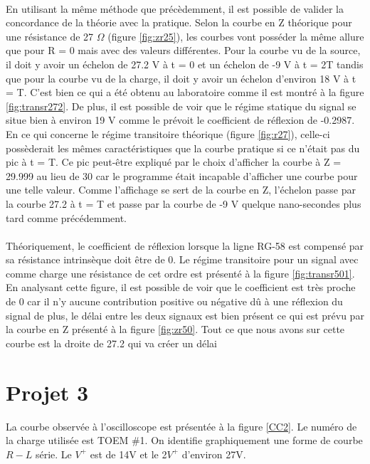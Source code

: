 \paragraph{} En utilisant la même méthode que précèdemment, il est possible de valider la concordance de la théorie avec la pratique. Selon la courbe en Z théorique pour une résistance de 27 $\Omega$ (figure \ref{fig:zr25}), les courbes vont posséder la même allure que pour R = 0 mais avec des valeurs différentes. Pour la courbe vu de la source, il doit y avoir un échelon de 27.2 V à t = 0 et un échelon de -9 V à t = 2T tandis que pour la courbe vu de la charge, il doit y avoir un échelon d'environ 18 V à t = T. C'est bien ce qui a été obtenu au laboratoire comme il est montré à la figure \ref{fig:transr272}. De plus, il est possible de voir que le régime statique du signal se situe bien à environ 19 V comme le prévoit le coefficient de réflexion de -0.2987. En ce qui concerne le régime transitoire théorique (figure \ref{fig:r27}), celle-ci possèderait les mêmes caractéristiques que la courbe pratique si ce n'était pas du pic à t = T. Ce pic peut-être expliqué par le choix d'afficher la courbe à Z = 29.999 au lieu de 30 car le programme était incapable d'afficher une courbe pour une telle valeur. Comme l'affichage se sert de la courbe en Z, l'échelon passe par la courbe 27.2 à t = T et passe par la courbe de -9 V quelque nano-secondes plus tard comme précédemment.

\paragraph{} Théoriquement, le coefficient de réflexion lorsque la ligne RG-58 est compensé par sa résistance intrinsèque doit être de 0. Le régime transitoire pour un signal avec comme charge une résistance de cet ordre est présenté à la figure \ref{fig:transr501}. En analysant cette figure, il est possible de voir que le coefficient est très proche de 0 car il n'y aucune contribution positive ou négative dû à une réflexion du signal de plus, le délai entre les deux signaux est bien présent ce qui est prévu par la courbe en Z présenté à la figure \ref{fig:zr50}. Tout ce que nous avons sur cette courbe est la droite de 27.2 qui va créer un délai 

\clearpage
\newpage
\section{Projet 3}
La courbe observée à l'oscilloscope est présentée à la figure \ref{CC2}. Le numéro de la charge utilisée est TOEM \#1. On identifie graphiquement une forme de courbe $R-L$ série.  Le $V^{+}$  est de 14V et le 2$V^{+}$ d'environ 27V.

